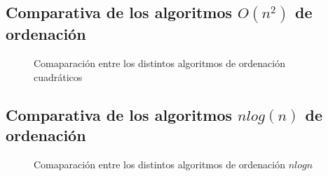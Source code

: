 \documentclass{article}
\begin{document}
\subsection{Comparativa de los algoritmos $O(n^2)$ de ordenación}

\begin{figure}[H]
  \centering   
      \subfloat {%

        
        
      }
      



\caption{Comaparación entre los distintos algoritmos de ordenación cuadráticos}
\end{figure}


\subsection{Comparativa de los algoritmos $nlog(n)$ de ordenación}

\begin{figure}[H]
  \centering   
      \subfloat {%

        
        
      }
      
      \caption{Comaparación entre los distintos algoritmos de ordenación $nlogn$}
\end{figure}
\end{document}

